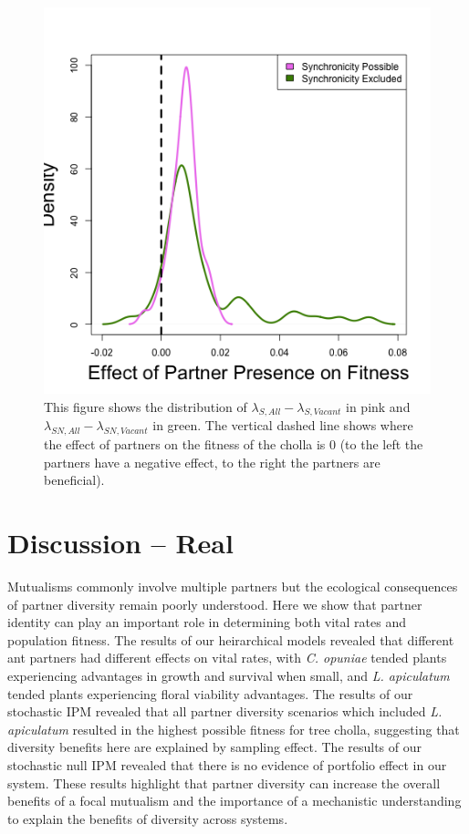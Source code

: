 \documentclass[11pt]{article}
\begin{document}
\begin{figure}
	\includegraphics[width=\linewidth]{Figures/portfolio_effect.png}
	\caption{This figure shows the distribution of $\lambda_{S,All}-\lambda_{S,Vacant}$ in pink and $\lambda_{SN,All}-\lambda_{SN,Vacant}$ in green. The vertical dashed line shows where the effect of partners on the fitness of the cholla is 0 (to the left the partners have a negative effect, to the right the partners are beneficial).}
	\label{fig:Portfolio}
\end{figure}



\section*{Discussion -- Real}
Mutualisms commonly involve multiple partners but the ecological consequences of partner diversity remain poorly understood. 
Here we show that partner identity can play an important role in determining both vital rates and population fitness. 
The results of our heirarchical models revealed that different ant partners had different effects on vital rates, with \textit{C. opuniae} tended plants experiencing advantages in growth and survival when small, and \textit{L. apiculatum} tended plants experiencing floral viability advantages.
The results of our stochastic IPM revealed that all partner diversity scenarios which included \textit{L. apiculatum} resulted in the highest possible fitness for tree cholla, suggesting that diversity benefits here are explained by sampling effect. 
The results of our stochastic null IPM revealed that there is no evidence of portfolio effect in our system. 
These results highlight that partner diversity can increase the overall benefits of a focal mutualism and the importance of a mechanistic understanding to explain the benefits of diversity across systems.
\end{document}
